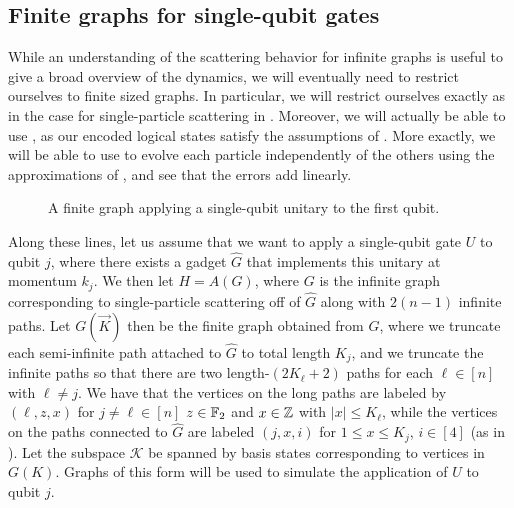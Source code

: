 \documentclass[../thesis-main/thesis-main]{subfiles}
\begin{document}
\subsection{Finite graphs for single-qubit gates}

While an understanding of the scattering behavior for infinite graphs is useful to give a broad overview of the dynamics, we will eventually need to restrict ourselves to finite sized graphs.  In particular, we will restrict ourselves exactly as in the case for single-particle scattering in .  Moreover, we will actually be able to use , as our encoded logical states satisfy the assumptions of .  More exactly, we will be able to use  to evolve each particle independently of the others using the approximations of , and see that the errors add linearly.

\begin{figure}
  \centering  
  
  \caption[MPQW single-qubit unitary]{A finite graph applying a single-qubit unitary to the first qubit.}
\label{fig:MP_u_sqf}
\end{figure}


Along these lines, let us assume that we want to apply a single-qubit gate $U$ to qubit $j$, where there exists a gadget $\widehat{G}$ that implements this unitary at momentum $k_j$.  We then let $H = A(G)$, where $G$ is the infinite graph corresponding to single-particle scattering off of $\widehat{G}$ along with $2(n-1)$ infinite paths.  Let $G(\vec{K})$ then be the finite graph obtained from $G$, where we truncate each semi-infinite path attached to $\widehat{G}$ to total length $K_j$, and we truncate the infinite paths so that there are two length-$(2K_\ell+2)$ paths for each $\ell\in [n]$ with $\ell\neq j$.  We have that the vertices on the long paths are labeled by $(\ell,z,x)$ for $j\neq\ell\in [n]$ $z\in \mathbb{F}_2$ and $x\in \mathbb{Z}$ with $|x| \leq K_\ell$, while the vertices on the paths connected to $\widehat{G}$ are labeled $(j,x,i)$ for $1\leq x \leq K_j$, $i\in [4]$ (as in ).  Let the subspace $\mathcal{K}$ be spanned by basis states corresponding to vertices in $G(K)$.  Graphs of this form will be used to simulate the application of $U$ to qubit $j$.
\end{document}
